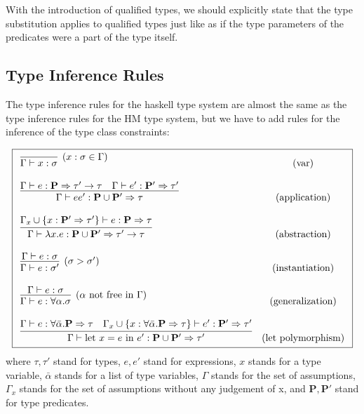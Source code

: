 With the introduction of qualified types, we should explicitly state that the type substitution applies to qualified types just like as if the type parameters of the predicates were a part of the type itself.

\subsection{Type Inference Rules}

The type inference rules for the haskell type system are almost the same as the type inference rules for the HM type system, but we have to add rules for the inference of the type class constraints:

\begin{defn}
    $$\boxed{\begin{array}{l c}
        \infer[(x : \sigma \in \Gamma)]{\Gamma \vdash x : \sigma}{} & (\text{var}) \\\\
        \infer{\Gamma \vdash e e' : \mathbf{P} \cup \mathbf{P'}  \Rightarrow \tau}{\Gamma \vdash e : \mathbf{P} \Rightarrow \tau' \rightarrow \tau & \Gamma \vdash e' : \mathbf{P'} \Rightarrow \tau'} & (\text{application}) \\\\
        \infer{\Gamma \vdash \lambda x . e : \mathbf{P} \cup \mathbf{P'} \Rightarrow \tau' \rightarrow \tau}{\Gamma_x \cup \{x : \mathbf{P'} \Rightarrow \tau'\} \vdash e : \mathbf{P} \Rightarrow \tau} & (\text{abstraction}) \\\\
        \infer[(\sigma > \sigma')]{\Gamma \vdash e : \sigma'}{\Gamma \vdash e : \sigma} & (\text{instantiation}) \\\\
        \infer[(\alpha \text{ not free in }\Gamma)]{\Gamma \vdash e : \forall \alpha . \sigma}{\Gamma \vdash e : \sigma} & (\text{generalization}) \\\\
        \infer{\Gamma \vdash \text{let } x = e \text{ in } e' : \mathbf{P} \cup \mathbf{P'} \Rightarrow \tau'}{\Gamma \vdash e : \forall \bar{\alpha} .  \mathbf{P} \Rightarrow \tau & \Gamma_x \cup \{x :\forall \bar{\alpha} .  \mathbf{P} \Rightarrow \tau \} \vdash e' : \mathbf{P'} \Rightarrow \tau'} & (\text{let polymorphism})
    \end{array}}$$
    where $\tau, \tau'$ stand for types, $e, e'$ stand for expressions, $x$ stands for a type variable, $\bar{\alpha}$ stands for a list of type variables, $\Gamma$ stands for the set of assumptions, $\Gamma_x$ stands for the set of assumptions without any judgement of x, and $\mathbf{P}, \mathbf{P'}$ stand for type predicates.
\end{defn}

